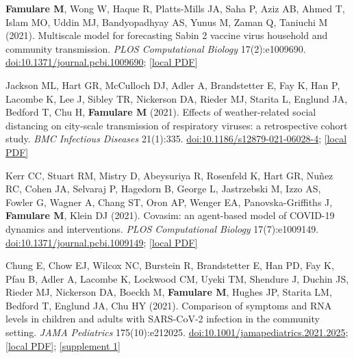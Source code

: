 \documentclass{article}
\begin{document}
\begin{llist}
\begin{items}
\item[{[27]}] \textbf{Famulare M}, Wong W, Haque R, Platts-Mills JA, Saha P, Aziz AB, Ahmed T, Islam MO, Uddin MJ, Bandyopadhyay AS, Yunus M, Zaman Q, Taniuchi M (2021). Multiscale model for forecasting Sabin 2 vaccine virus household and community transmission. \emph{PLOS Computational Biology} 17(2):e1009690. \href{https://doi.org/10.1371/journal.pcbi.1009690}{doi:10.1371/journal.pcbi.1009690}; \href{https://famulare.github.io/assets/publication-mirror/journal-27.pdf}{[local PDF]}

\item[{[26]}] Jackson ML, Hart GR, McCulloch DJ, Adler A, Brandstetter E, Fay K, Han P, Lacombe K, Lee J, Sibley TR, Nickerson DA, Rieder MJ, Starita L, Englund JA, Bedford T, Chu H, \textbf{Famulare M} (2021). Effects of weather-related social distancing on city-scale transmission of respiratory viruses: a retrospective cohort study. \emph{BMC Infectious Diseases} 21(1):335. \href{https://bmcinfectdis.biomedcentral.com/articles/10.1186/s12879-021-06028-4}{doi:10.1186/s12879-021-06028-4}; \href{https://famulare.github.io/assets/publication-mirror/journal-26.pdf}{[local PDF]}

\item[{[25]}] Kerr CC, Stuart RM, Mistry D, Abeysuriya R, Rosenfeld K, Hart GR, Nu\~{n}ez RC, Cohen JA, Selvaraj P, Hagedorn B, George L, Jastrzebski M, Izzo AS, Fowler G, Wagner A, Chang ST, Oron AP, Wenger EA, Panovska-Griffiths J, \textbf{Famulare M}, Klein DJ (2021). Covasim: an agent-based model of COVID-19 dynamics and interventions. \emph{PLOS Computational Biology} 17(7):e1009149. \href{https://doi.org/10.1371/journal.pcbi.1009149}{doi:10.1371/journal.pcbi.1009149}; \href{https://famulare.github.io/assets/publication-mirror/journal-25.pdf}{[local PDF]}

\item[{[24]}] Chung E, Chow EJ, Wilcox NC, Burstein R, Brandstetter E, Han PD, Fay K, Pfau B, Adler A, Lacombe K, Lockwood CM, Uyeki TM, Shendure J, Duchin JS, Rieder MJ, Nickerson DA, Boeckh M, \textbf{Famulare M}, Hughes JP, Starita LM, Bedford T, Englund JA, Chu HY (2021). Comparison of symptoms and RNA levels in children and adults with SARS-CoV-2 infection in the community setting. \emph{JAMA Pediatrics} 175(10):e212025. \href{https://doi.org/10.1001/jamapediatrics.2021.2025}{doi:10.1001/jamapediatrics.2021.2025}; \href{https://famulare.github.io/assets/publication-mirror/Chung_et_al_2021_Comparison_of_symptoms_and_RNA_levels_in_children_and_adults.pdf}{[local PDF]}; \href{https://famulare.github.io/assets/publication-mirror/supplements/Chung_et_al_2021_supplement.pdf}{[supplement 1]}


\end{items}
\end{llist}
\end{document}
